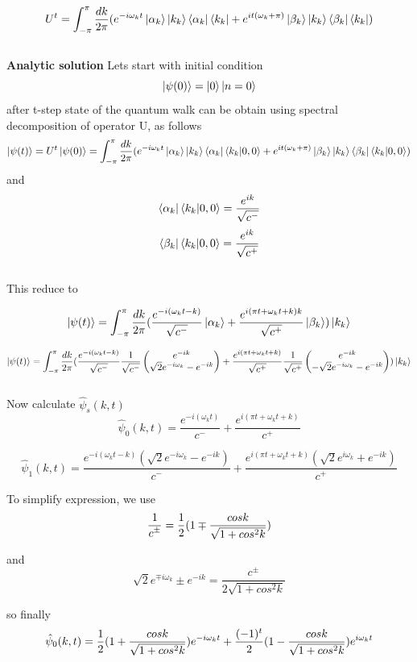 \documentclass[11 pt]{article}
\theoremstyle{definition}
\theoremstyle{remark}
\newcommand{\di}{i}
\newcommand{\rpm}{\sbox0{$1$}\sbox2{$\scriptstyle\pm$}
  \raise\dimexpr(\ht0-\ht2)/2\relax\box2 }
\begin{document}
$$U^t = \int_{-\pi}^{\pi}\dfrac{dk}{2\pi}(e^{-\di\omega_k t}\ket{\alpha_k}\ket{k_k}\bra{\alpha_k}\bra{k_k} + e^{\di t(\omega_k+\pi)}\ket{\beta_k}\ket{k_k}\bra{\beta_k}\bra{k_k})$$
\\
\textbf{Analytic solution }
Lets start with initial condition $$\ket{\psi(0)} = \ket{0}\ket{n=0}$$
after t-step state of the quantum walk can be obtain using spectral decomposition of operator U, as follows
$$\ket{\psi(t)} = U^t\ket{\psi(0)} = \int_{-\pi}^{\pi}\dfrac{dk}{2\pi}(e^{-\di\omega_k t}\ket{\alpha_k}\ket{k_k}\bra{\alpha_k}\bra{k_k}\ket{0,0} + e^{\di t(\omega_k+\pi)}\ket{\beta_k}\ket{k_k}\bra{\beta_k}\bra{k_k}\ket{0,0})$$
and $$\bra{\alpha_k}\bra{k_k}\ket{0,0} = \dfrac{e^{\di k}}{\sqrt{c^{-}}}$$
$$\bra{\beta_k}\bra{k_k}\ket{0,0} = \dfrac{e^{\di k}}{\sqrt{c^{+}}}$$
\\
This reduce to 

$$\ket{\psi(t)} = \int_{-\pi}^{\pi}\dfrac{dk}{2\pi}(\dfrac{e^{-\di(\omega_k  t-k)}}{\sqrt{c^{-}}}\ket{\alpha_k} + \dfrac{e^{\di(\pi t+\omega_k t+ k) k}}{\sqrt{c^{+}}}\ket{\beta_k})\ket{k_k}$$

$$\ket{\psi(t)} = \int_{-\pi}^{\pi}\dfrac{dk}{2\pi}(\dfrac{e^{-\di(\omega_k  t-k)}}{\sqrt{c^{-}}} \dfrac{1}{\sqrt{c^{-}}}\begin{pmatrix}
           e^{-\di k}\\
           \sqrt{2}e^{-\di \omega_k} - e^{-\di k}
\end{pmatrix} + \dfrac{e^{\di(\pi t+\omega_k t+ k) }}{\sqrt{c^{+}}}\dfrac{1}{\sqrt{c^{+}}}\begin{pmatrix}
           e^{-\di k}\\
           -\sqrt{2}e^{-\di \omega_k} - e^{-\di k}
\end{pmatrix})\ket{k_k}$$
\\
Now calculate $\hat{\psi}_s(k,t)$
$$\hat{\psi}_0 (k,t) = \dfrac{e^{-\di(\omega_k  t)}}{c^{-}} + \dfrac{e^{\di(\pi t+\omega_k t+ k) }}{c^{+}} $$

$$\hat{\psi}_1(k,t) = \dfrac{e^{-\di(\omega_k  t-k)}(\sqrt{2}e^{-\di \omega_k} - e^{-\di k})}{c^{-}} + \dfrac{e^{\di(\pi t+\omega_k t+ k)}(\sqrt{2}e^{\di \omega_k} + e^{-\di k})}{c^{+}}$$

To simplify expression, we use
$$\frac{1}{c^{\rpm}} = \dfrac{1}{2}(1\mp \dfrac{cosk}{\sqrt{1+cos^2k}})$$

and 
$$\sqrt{2} e^{\mp\di\omega_k} \pm e^{-\di k} = \dfrac{c^{\pm}}{2\sqrt{1+cos^2k}}$$

so finally 
$$ \Hat{\psi}_0(k,t) = \dfrac{1}{2}(1 + \dfrac{cosk}{\sqrt{1+cos^2k}}) e^{-\di\omega_k t} +\dfrac{(-1)^t}{2}(1 - \dfrac{cosk}{\sqrt{1+cos^2k}}) e^{\di\omega_k t} $$
\end{document}
